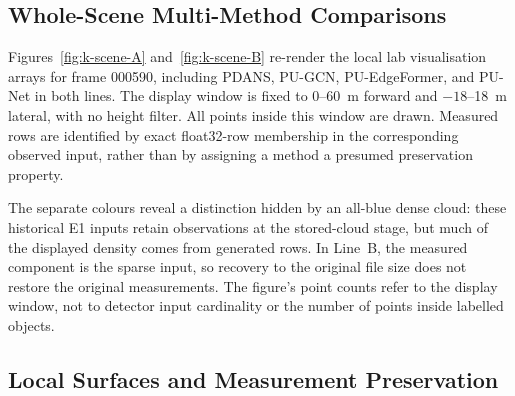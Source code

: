 \FloatBarrier
\subsection{Whole-Scene Multi-Method Comparisons}
\label{sec:kitti-scene-visual}



Figures~\ref{fig:k-scene-A} and~\ref{fig:k-scene-B} re-render the local
lab visualisation arrays for frame 000590, including PDANS, PU-GCN,
PU-EdgeFormer, and PU-Net in both lines. The display window is fixed to
0--60~m forward and $-18$--18~m lateral, with no height filter.
All points inside this window are drawn. Measured rows are identified
by exact float32-row membership in the corresponding observed input,
rather than by assigning a method a presumed preservation property.

The separate colours reveal a distinction hidden by an all-blue dense
cloud: these historical E1 inputs retain observations at the stored-cloud
stage, but much of the displayed density comes from generated rows.
In Line~B, the measured component is the sparse input, so recovery
to the original file size does not restore the original measurements.
The figure's point counts refer to the display window, not to detector
input cardinality or the number of points inside labelled objects.

\FloatBarrier
\subsection{Local Surfaces and Measurement Preservation}
\label{sec:kitti-local-visual}


